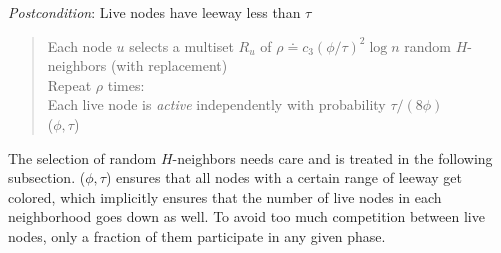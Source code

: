     \emph{Postcondition}: Live nodes have leeway less than $\tau$

\begin{quote}
   Each node $u$ selects a multiset $R_u$ of $\rho \doteq c_3 (\phi/\tau)^2 \log n$ random $H$-neighbors (with replacement) \\
    Repeat $\rho$ times: \\
    \hspace*{2em} Each live node is \emph{active} independently with probability $\tau/(8\phi)$ \\
    \hspace*{2em} ($\phi,\tau$) 
\end{quote}

The selection of random $H$-neighbors needs care and is treated in the following subsection.
($\phi,\tau$) ensures that all nodes with a certain range of leeway get colored, which implicitly ensures that the number of live nodes in each neighborhood goes down as well. To avoid too much competition between live nodes, only a fraction of them participate in any given phase.
    

